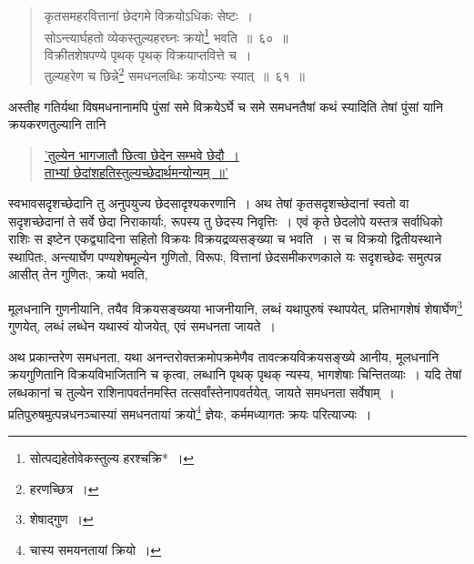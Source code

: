 \documentclass[10pt, openany]{book}
\begin{document}
{{ \label{60}
\begin{quote}
    
{\bs कृतसमहरवित्तानां छेदगमे विक्रयोऽधिकः सेष्टः~। \\
 सोऽन्त्यार्घहतो व्येकस्तुल्यहरघ्नः क्रयो\renewcommand{\thefootnote}{\s ६}\footnote{\s सोत्पद्यहेतोवेकस्तुल्य हरश्चक्रि*~।}  भवति~॥~६०~॥ \\
 विक्रीतशेषपण्ये पृथक् पृथक् विक्रयाप्तवित्ते च~। \\
 तुल्यहरेण च छिन्ने\renewcommand{\thefootnote}{\s ७}\footnote{\s *हरणच्छित्र~।}  समधनलब्धिः क्रयोऽन्यः स्यात्~॥~६१~॥}\end{quote}

{अस्तीह गतिर्यथा विषमधनानामपि पुंसां समे विक्रयेऽर्घे च समे समधनतैषां
कथं}
{स्यादिति तेषां पुंसां यानि क्रयकरणतुल्यानि तानि}

\begin{quote}
    
\hyperref[36]{'तुल्येन भागजातौ छित्वा छेदेन सम्भवे छेदौ~। \\
 ताभ्यां छेदांशहतिस्तुल्यच्छेदार्थमन्योन्यम्~॥'}\end{quote}

{स्वभावसदृशच्छेदानि तु अनुपयुज्य छेदसादृश्यकरणानि~। अथ तेषां
कृतसदृशच्छेदानां}
{स्वतो वा सदृशच्छेदानां ते सर्वे छेदा निराकार्याः, रूपस्य तु छेदस्य
निवृत्तिः~। एवं कृते}
{छेदलोपे यस्तत्र सर्वाधिको राशिः स इष्टेन एकद्व्यादिना सहितो विक्रयः
विक्रयद्रव्यसङ्ख्या}
{च भवति~। स च विक्रयो द्वितीयस्थाने स्थापितः, अन्त्यार्घेण
पण्यशेषमूल्येन गुणितो,}
{विरूपः, वित्तानां छेदसमीकरणकाले यः सदृशच्छेदः समुत्पन्न आसीत् तेन
गुणितः, क्रयो भवति, }



\newpage

{मूलधनानि गुणनीयानि, तयैव विक्रयसङ्ख्यया भाजनीयानि, लब्धं यथापुरुषं
स्थापयेत्,}
{प्रतिभागशेषं शेषार्घेण\renewcommand{\thefootnote}{\s १}\footnote{\s शेषाद्गुण~।} गुणयेत्, लब्धं लब्धेन यथास्वं योजयेत्, एवं
समधनता जायते~।}
\vspace{3mm}

{अथ प्रकान्तरेण समधनता, यथा अनन्तरोक्तक्रमोपक्रमेणैव
तावत्क्रयविक्रयसङ्ख्ये}
{आनीय, मूलधनानि क्रयगुणितानि विक्रयविभाजितानि च कृत्वा, लब्धानि पृथक्
पृथक्}
{न्यस्य, भागशेषाः चिन्तितव्याः~। यदि तेषां लब्धकानां च तुल्येन
राशिनापवर्तनमस्ति}
{तत्सर्वांस्तेनापवर्तयेत्, जायते समधनता सर्वेषाम्~।
प्रतिपुरुषमुत्पन्नधनञ्चास्यां समधनतायां}
{क्रयो\renewcommand{\thefootnote}{\s २}\footnote{\s *चास्य समयनतायां क्रियो~।}  ज्ञेयः, कर्ममध्यागतः क्रयः परित्याज्यः~।}

}}
\end{document}
